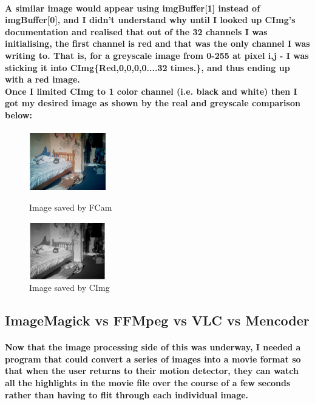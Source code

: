 \documentclass[11pt]{article} %
\begin{document}
\paragraph{
A similar image would appear using imgBuffer[1] instead of imgBuffer[0], and I didn't understand why until I looked up CImg's documentation and realised that out of the 32 channels I was initialising, the first channel is red and that was the only channel I was writing to.
That is, for a greyscale image from 0-255 at pixel i,j - I was sticking it into CImg\{Red,0,0,0,0....32 times.\}, and thus ending up with a red image.
\\Once I limited CImg to 1 color channel (i.e. black and white) then I got my desired image as shown by the real and greyscale comparison below:
}
\begin{figure}
	\vspace{-20pt}
	\begin{center}
		\includegraphics[width=0.3\textwidth]{../images/realbuffer2}
	\end{center}
	\vspace{-20pt}
	\caption{Image saved by FCam}
	\vspace{10pt}
	\begin{center}
		\includegraphics[width=0.3\textwidth]{../images/blackbuffer3}
	\end{center}
	\caption{Image saved by CImg}
	\vspace{-20pt}
\end{figure}

\subsection{ImageMagick vs FFMpeg vs VLC vs Mencoder}
\paragraph{Now that the image processing side of this was underway, I needed a program that could convert a series of images into a movie format so that when the user returns to their motion detector, they can watch all the highlights in the movie file over the course of a few seconds rather than having to flit through each individual image.
}
\end{document}
